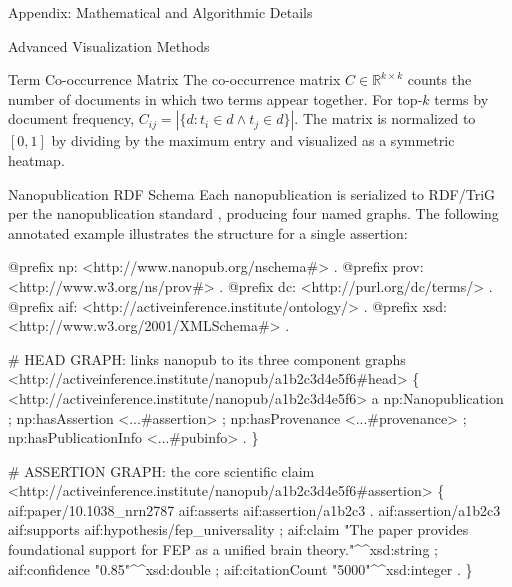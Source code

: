 \documentclass[
  ignorenonframetext,
]{beamer}
\newenvironment{Shaded}{}{}
\newcommand{\NormalTok}[1]{#1}
\begin{document}
\begin{frame}[fragile]{Appendix: Mathematical and Algorithmic Details
\label{sec:technical_appendix}}
\begin{block}{Advanced Visualization Methods \label{sec:appendix_viz}}
\begin{block}{Term Co-occurrence Matrix}
\protect{}\label{term-co-occurrence-matrix}
The co-occurrence matrix \(C \in \mathbb{R}^{k \times k}\) counts the
number of documents in which two terms appear together. For top-\(k\)
terms by document frequency,
\(C_{ij} = |\{d : t_i \in d \land t_j \in d\}|\). The matrix is
normalized to \([0, 1]\) by dividing by the maximum entry and visualized
as a symmetric heatmap.
\end{block}
\end{block}

\begin{block}{Nanopublication RDF Schema \label{sec:appendix_rdf}}
\protect{}\label{nanopublication-rdf-schema}
Each nanopublication is serialized to RDF/TriG per the nanopublication
standard \citep{groth2010anatomy, kuhn2016decentralized}, producing four
named graphs. The following annotated example illustrates the structure
for a single assertion:

\begin{Shaded}
\begin{Highlighting}[]
\NormalTok{@prefix np: \textless{}http://www.nanopub.org/nschema\#\textgreater{} .}
\NormalTok{@prefix prov: \textless{}http://www.w3.org/ns/prov\#\textgreater{} .}
\NormalTok{@prefix dc: \textless{}http://purl.org/dc/terms/\textgreater{} .}
\NormalTok{@prefix aif: \textless{}http://activeinference.institute/ontology/\textgreater{} .}
\NormalTok{@prefix xsd: \textless{}http://www.w3.org/2001/XMLSchema\#\textgreater{} .}

\NormalTok{\# HEAD GRAPH: links nanopub to its three component graphs}
\NormalTok{\textless{}http://activeinference.institute/nanopub/a1b2c3d4e5f6\#head\textgreater{} \{}
\NormalTok{  \textless{}http://activeinference.institute/nanopub/a1b2c3d4e5f6\textgreater{}}
\NormalTok{    a np:Nanopublication ;}
\NormalTok{    np:hasAssertion   \textless{}...\#assertion\textgreater{} ;}
\NormalTok{    np:hasProvenance   \textless{}...\#provenance\textgreater{} ;}
\NormalTok{    np:hasPublicationInfo \textless{}...\#pubinfo\textgreater{} .}
\NormalTok{\}}

\NormalTok{\# ASSERTION GRAPH: the core scientific claim}
\NormalTok{\textless{}http://activeinference.institute/nanopub/a1b2c3d4e5f6\#assertion\textgreater{} \{}
\NormalTok{  aif:paper/10.1038\_nrn2787 aif:asserts aif:assertion/a1b2c3 .}
\NormalTok{  aif:assertion/a1b2c3}
\NormalTok{    aif:supports aif:hypothesis/fep\_universality ;}
\NormalTok{    aif:claim "The paper provides foundational support for FEP as a}
\NormalTok{               unified brain theory."\^{}\^{}xsd:string ;}
\NormalTok{    aif:confidence "0.85"\^{}\^{}xsd:double ;}
\NormalTok{    aif:citationCount "5000"\^{}\^{}xsd:integer .}
\NormalTok{\}}


\end{Highlighting}
\end{Shaded}
\end{block}
\end{frame}
\end{document}
